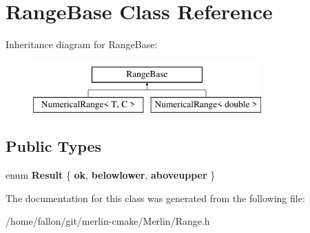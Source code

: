 \hypertarget{classRangeBase}{}\section{Range\+Base Class Reference}
\label{classRangeBase}
Inheritance diagram for Range\+Base\+:\begin{figure}[H]
\begin{center}
\leavevmode
\includegraphics[height=2.000000cm]{classRangeBase}
\end{center}
\end{figure}
\subsection*{Public Types}
\begin{DoxyCompactItemize}
\item 
\mbox{\label{classRangeBase_ab062baecf890fc4b3eb47f4ed45adf18}} 
enum {\bfseries Result} \{ {\bfseries ok}, 
{\bfseries belowlower}, 
{\bfseries aboveupper}
 \}
\end{DoxyCompactItemize}


The documentation for this class was generated from the following file\+:\begin{DoxyCompactItemize}
\item 
/home/fallon/git/merlin-\/cmake/\+Merlin/Range.\+h\end{DoxyCompactItemize}

